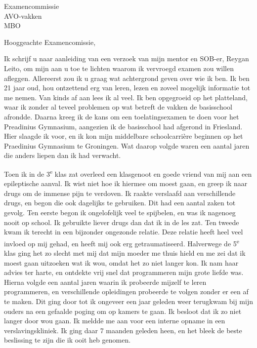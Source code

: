 \documentclass{letter}
\begin{document}
\begin{letter}{Examencommissie \\ AVO-vakken \\ MBO}
\opening{Hooggeachte Examencomissie,}

Ik schrijf u naar aanleiding van een verzoek van mijn mentor en SOB-er, Reygan Leito, om mijn
aan u toe te lichten waarom ik vervroegd examen zou willen afleggen.
Allereerst zou ik u graag wat achtergrond geven over wie ik ben.
Ik ben 21 jaar oud, hou ontzettend erg van leren, lezen en zoveel mogelijk informatie
tot me nemen. Van kinds af aan lees ik al veel.
Ik ben opgegroeid op het platteland, waar ik zonder al teveel problemen op wat betreft de vakken
de basisschool afrondde. Daarna kreeg ik de kans om een toelatingsexamen te doen
voor het Preadinius Gymnasium, aangezien ik de basisschool had afgerond in Friesland. 
Hier slaagde ik voor, en ik kon mijn middelbare schoolcarrière beginnen op het Praedinius
Gymnasium te Groningen. Wat daarop volgde waren een aantal jaren die anders liepen dan ik
had verwacht.

Toen ik in de 3\textsuperscript{e} klas zat overleed een klasgenoot en goede vriend van mij aan
een epileptische aanval. Ik wist niet hoe ik hiermee om moest gaan, en greep ik naar drugs om
de immense pijn te verdoven. Ik raakte verslaafd aan verschillende drugs, en 
begon die ook dagelijks te gebruiken. Dit had een aantal zaken tot gevolg. Ten eerste begon ik 
ongelofelijk veel te spijbelen, en was ik nagenoeg nooit op school. Ik gebruikte liever drugs 
dan dat ik in de les zat. Ten tweede kwam ik terecht in een bijzonder ongezonde relatie. 
Deze relatie heeft heel veel invloed op mij gehad,
en heeft mij ook erg getraumatiseerd. Halverwege de 5\textsuperscript{e} klas ging het zo slecht
met mij dat mijn moeder me thuis hield en me zei dat ik moest gaan uitzoeken wat ik wou, omdat het zo niet langer kon.
Ik nam haar advies ter harte, en ontdekte vrij snel dat programmeren mijn grote
liefde was. Hierna volgde een aantal jaren waarin ik probeerde mijzelf te leren programmeren, en 
verschillende opleidingen probeerde te volgen zonder er een af te maken. Dit ging door tot ik ongeveer
een jaar geleden weer terugkwam bij mijn ouders na een gefaalde poging om op kamers te gaan. 
Ik besloot dat ik zo niet langer door wou gaan. Ik meldde me aan voor een interne opname in een 
verslavingskliniek. Ik ging daar 7 maanden geleden heen, en het bleek de beste beslissing te zijn 
die ik ooit heb genomen.


\end{letter}
\end{document}
